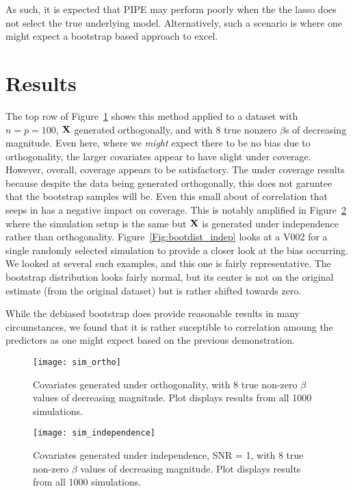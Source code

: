 As such, it is expected that PIPE may perform poorly when the the lasso does not select the true underlying model. Alternatively, such a scenario is where one might expect a bootstrap based approach to excel.

\section{Results}

The top row of Figure~\ref{Fig:sim_ortho} shows this method applied to a dataset with $n = p = 100$, $\mathbf{X}$ generated orthogonally, and with 8 true nonzero $\beta$s of decreasing magnitude. Even here, where we \emph{might} expect there to be no bias due to orthogonality, the larger covariates appear to have slight under coverage. However, overall, coverage appears to be satisfactory. The under coverage results because despite the data being generated orthogonally, this does not garuntee that the bootstrap samples will be. Even this small about of correlation that seeps in has a negative impact on coverage. This is notably amplified in Figure~\ref{Fig:sim_independence} where the simulation setup is the same but $\mathbf{X}$ is generated under independence rather than orthogonality. Figure~\ref{Fig:bootdist_indep} looks at a V002 for a single randomly selected simulation to provide a closer look at the bias occurring. We looked at several such examples, and this one is fairly representative. The bootstrap distribution looks fairly normal, but its center is not on the original estimate (from the original dataset) but is rather shifted towards zero.

While the debiased bootstrap does provide reasonable results in many circumstances, we found that it is rather suceptible to correlation amoung the predictors as one might expect based on the previous demonstration. 

\begin{figure}[hbtp]
    \begin{center}
    \texttt{[image: sim\_ortho]}
    \caption{\label{Fig:sim_ortho} Covariates generated under orthogonality, with 8 true non-zero $\beta$ values of decreasing magnitude. Plot displays results from all 1000 simulations.}
    \end{center}
\end{figure}

\begin{figure}[hbtp]
    \begin{center}
    \texttt{[image: sim\_independence]}
    \caption{\label{Fig:sim_independence} Covariates generated under independence, SNR = 1, with 8 true non-zero $\beta$ values of decreasing magnitude. Plot displays results from all 1000 simulations.}
    \end{center}
\end{figure}

